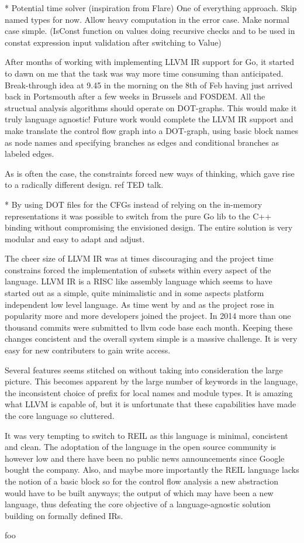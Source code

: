 * Potential time solver (inspiration from Flare)
One of everything approach. Skip named types for now. Allow heavy computation in the error case. Make normal case simple. (IsConst function on values doing recursive checks and to be used in constat expression input validation after switching to Value)


After months of working with implementing LLVM IR support for Go, it started to dawn on me that the task was way more time consuming than anticipated. Break-through idea at 9.45 in the morning on the 8th of Feb having just arrived back in Portsmouth after a few weeks in Brussels and FOSDEM. All the structual analysis algorithms should operate on DOT-graphs. This would make it truly language agnostic! Future work would complete the LLVM IR support and make translate the control flow graph into a DOT-graph, using basic block names as node names and specifying branches as edges and conditional branches as labeled edges.

As is often the case, the constraints forced new ways of thinking, which gave rise to a radically different design. ref TED talk.

* By using DOT files for the CFGs instead of relying on the in-memory representations it was possible to switch from the pure Go lib to the C++ binding without compromising the envisioned design. The entire solution is very modular and easy to adapt and adjust.


The cheer size of LLVM IR was at times discouraging and the project time constrains forced the implementation of subsets within every aspect of the language. LLVM IR is a RISC like assembly language which seems to have started out as a simple, quite minimalistic and in some aspects platform independent low level language. As time went by and as the project rose in popularity more and more developers joined the project. In 2014 more than one thousand commits were submitted to llvm code base each month. Keeping these changes concistent and the overall system simple is a massive challenge. It is very easy for new contributers to gain write access.

Several features seems stitched on without taking into consideration the large picture. This becomes apparent by the large number of keywords in the language, the inconsistent choice of prefix for local names and module types. It is amazing what LLVM is capable of, but it is unfortunate that these capabilities have made the core language so cluttered.

It was very tempting to switch to REIL as this language is minimal, concistent and clean. The adoptation of the language in the open source community is however low and there have been no public news announcements since Google bought the company. Also, and maybe more importantly the REIL language lacks the notion of a basic block so for the control flow analysis a new abstraction would have to be built anyways; the output of which may have been a new language, thus defeating the core objective of a language-agnostic solution building on formally defined IRs.


foo
